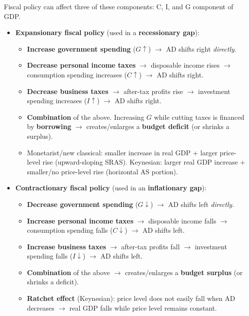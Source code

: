 Fiscal policy can affect three of these components: C, I, and G component of GDP.
\begin{itemize}
  \item \textbf{Expansionary fiscal policy} (used in a \textbf{recessionary gap}):
  \begin{itemize}
    \item \textbf{Increase government spending} ($G \uparrow$) $\to$ AD shifts right \textit{directly}.
    \item \textbf{Decrease personal income taxes} $\to$ disposable income rises $\to$ consumption spending increases ($C \uparrow$) $\to$ AD shifts right.
    \item \textbf{Decrease business taxes} $\to$ after-tax profits rise $\to$ investment spending increases ($I \uparrow$) $\to$ AD shifts right.
    \item \textbf{Combination} of the above. Increasing $G$ while cutting taxes is financed by \textbf{borrowing} $\to$ creates/enlarges a \textbf{budget deficit} (or shrinks a surplus).
    \item Monetarist/new classical: smaller increase in real GDP + larger price-level rise (upward-sloping SRAS). Keynesian: larger real GDP increase + smaller/no price-level rise (horizontal AS portion).
  \end{itemize}
  \item \textbf{Contractionary fiscal policy} (used in an \textbf{inflationary gap}):
  \begin{itemize}
    \item \textbf{Decrease government spending} ($G \downarrow$) $\to$ AD shifts left \textit{directly}.
    \item \textbf{Increase personal income taxes} $\to$ disposable income falls $\to$ consumption spending falls ($C \downarrow$) $\to$ AD shifts left.
    \item \textbf{Increase business taxes} $\to$ after-tax profits fall $\to$ investment spending falls ($I \downarrow$) $\to$ AD shifts left.
    \item \textbf{Combination} of the above $\to$ creates/enlarges a \textbf{budget surplus} (or shrinks a deficit).
    \item \textbf{Ratchet effect} (Keynesian): price level does not easily fall when AD decreases $\to$ real GDP falls while price level remains constant.
  \end{itemize}
\end{itemize}

